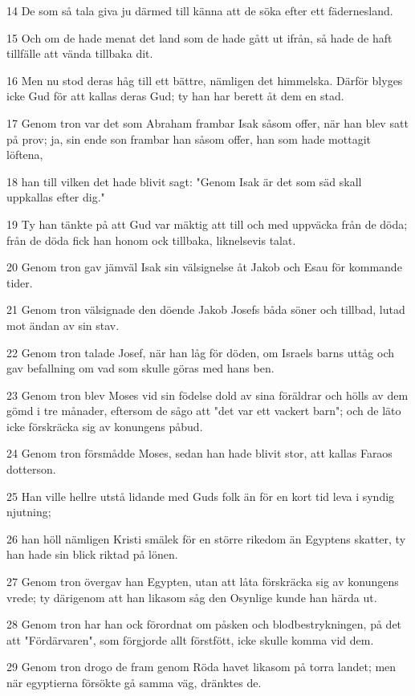 \par 14 De som så tala giva ju därmed till känna att de söka efter ett fädernesland.
\par 15 Och om de hade menat det land som de hade gått ut ifrån, så hade de haft tillfälle att vända tillbaka dit.
\par 16 Men nu stod deras håg till ett bättre, nämligen det himmelska. Därför blyges icke Gud för att kallas deras Gud; ty han har berett åt dem en stad.
\par 17 Genom tron var det som Abraham frambar Isak såsom offer, när han blev satt på prov; ja, sin ende son frambar han såsom offer, han som hade mottagit löftena,
\par 18 han till vilken det hade blivit sagt: "Genom Isak är det som säd skall uppkallas efter dig."
\par 19 Ty han tänkte på att Gud var mäktig att till och med uppväcka från de döda; från de döda fick han honom ock tillbaka, liknelsevis talat.
\par 20 Genom tron gav jämväl Isak sin välsignelse åt Jakob och Esau för kommande tider.
\par 21 Genom tron välsignade den döende Jakob Josefs båda söner och tillbad, lutad mot ändan av sin stav.
\par 22 Genom tron talade Josef, när han låg för döden, om Israels barns uttåg och gav befallning om vad som skulle göras med hans ben.
\par 23 Genom tron blev Moses vid sin födelse dold av sina föräldrar och hölls av dem gömd i tre månader, eftersom de sågo att "det var ett vackert barn"; och de läto icke förskräcka sig av konungens påbud.
\par 24 Genom tron försmådde Moses, sedan han hade blivit stor, att kallas Faraos dotterson.
\par 25 Han ville hellre utstå lidande med Guds folk än för en kort tid leva i syndig njutning;
\par 26 han höll nämligen Kristi smälek för en större rikedom än Egyptens skatter, ty han hade sin blick riktad på lönen.
\par 27 Genom tron övergav han Egypten, utan att låta förskräcka sig av konungens vrede; ty därigenom att han likasom såg den Osynlige kunde han härda ut.
\par 28 Genom tron har han ock förordnat om påsken och blodbestrykningen, på det att "Fördärvaren", som förgjorde allt förstfött, icke skulle komma vid dem.
\par 29 Genom tron drogo de fram genom Röda havet likasom på torra landet; men när egyptierna försökte gå samma väg, dränktes de.
